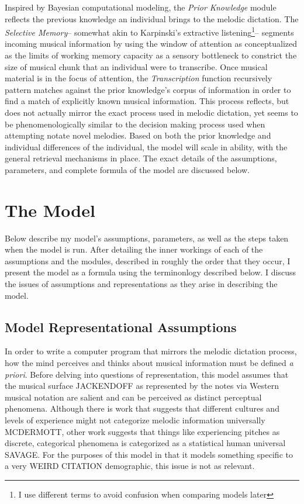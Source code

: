 \documentclass[]{book}
\let\rmarkdownfootnote\footnote%
\def\footnote{\protect\rmarkdownfootnote}
\theoremstyle{definition}
\theoremstyle{definition}
\theoremstyle{definition}
\theoremstyle{remark}
\begin{document}
Inspired by Bayesian computational modeling, the \emph{Prior Knowledge}
module reflects the previous knowledge an individual brings to the
melodic dictation. The \emph{Selective Memory}-- somewhat akin to
Karpinski's extractive listening\footnote{I use different terms to avoid
  confusion when comparing models later}-- segments incoming musical
information by using the window of attention as conceptualized as the
limits of working memory capacity as a sensory bottleneck to constrict
the size of musical chunk that an individual were to transcribe. Once
musical material is in the focus of attention, the \emph{Transcription}
function recursively pattern matches against the prior knowledge's
corpus of information in order to find a match of explicitly known
musical information. This process reflects, but does not actually mirror
the exact process used in melodic dictation, yet seems to be
phenomenologically similar to the decision making process used when
attempting notate novel melodies. Based on both the prior knowledge and
individual differences of the individual, the model will scale in
ability, with the general retrieval mechanisms in place. The exact
details of the assumptions, parameters, and complete formula of the
model are discussed below.

\hypertarget{the-model}{%
\section{The Model}\label{the-model}}

Below describe my model's assumptions, parameters, as well as the steps
taken when the model is run. After detailing the inner workings of each
of the assumptions and the modules, described in roughly the order that
they occur, I present the model as a formula using the terminonlogy
described below. I discuss the issues of assumptions and representations
as they arise in describing the model.

\hypertarget{model-representational-assumptions}{%
\subsection{Model Representational
Assumptions}\label{model-representational-assumptions}}

In order to write a computer program that mirrors the melodic dictation
process, how the mind perceives and thinks about musical information
must be defined \emph{a priori}. Before delving into questions of
representation, this model assumes that the musical surface JACKENDOFF
as represented by the notes via Western musical notation are salient and
can be perceived as distinct perceptual phenomena. Although there is
work that suggests that different cultures and levels of experience
might not categorize melodic information universally MCDERMOTT, other
work suggests that things like experiencing pitches as discrete,
categorical phenomena is categorized as a statistical human universal
SAVAGE. For the purposes of this model in that it models something
specific to a very WEIRD CITATION demographic, this issue is not as
relevant.
\end{document}

